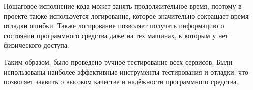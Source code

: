 Пошаговое исполнение кода может занять продолжительное время, поэтому в проекте также используется логирование, которое значительно сокращает время отладки ошибки. Также логирование позволяет получать информацию о состоянии программного средства даже на тех машинах, к которым у нет физического доступа.

Таким образом, было проведено ручное тестирование всех сервисов. Были использованы наиболее эффективные инструменты тестирования и отладки, что позволяет заявить о высоком качестве и надёжности программного средства.
